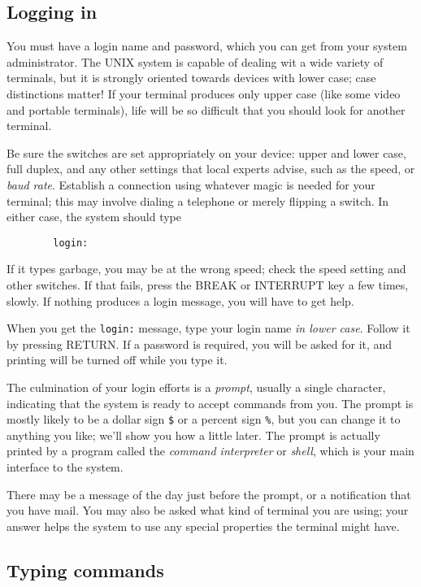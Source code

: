 \subsection{Logging in}

You must have a login name and password, which you can get from your system
administrator. The UNIX system is capable of dealing wit a wide variety of
terminals, but it is strongly oriented towards devices with lower case; case
distinctions matter! If your terminal produces only upper case (like some video
and portable terminals), life will be so difficult that you should look for
another terminal.

Be sure the switches are set appropriately on your device: upper and lower case,
full duplex, and any other settings that local experts advise, such as the
speed, or \textit{baud rate}. Establish a connection using whatever magic is
needed for your terminal; this may involve dialing a telephone or merely
flipping a switch. In either case, the system should type
\begin{verbatim}
        login:
\end{verbatim}
If it types garbage, you may be at the wrong speed; check the speed setting and
other switches. If that fails, press the BREAK or INTERRUPT key a few times,
slowly. If nothing produces a login message, you will have to get help.

When you get the \verb=login:= message, type your login name \textit{in lower
  case}. Follow it by pressing RETURN. If a password is required, you will be
asked for it, and printing will be turned off while you type it.

The culmination of your login efforts is a \textit{prompt}, usually a single
character, indicating that the system is ready to accept commands from you. The
prompt is mostly likely to be a dollar sign \verb=$= or a percent sign \verb=%=,
but you can change it to anything you like; we'll show you how a little
later. The prompt is actually printed by a program called the \textit{command
  interpreter} or \textit{shell}, which is your main interface to the system.

There may be a message of the day just before the prompt, or a notification that
you have mail. You may also be asked what kind of terminal you are using; your
answer helps the system to use any special properties the terminal might have.


\subsection{Typing commands}

